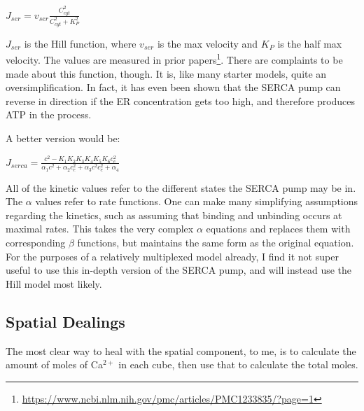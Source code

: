 \documentclass[12pt]{amsart}
\begin{document}
\begin{center}

    $J_{ser} = v_{ser}\frac{C^2_{cyt}}{C^2_{cyt} + K^2_P}$\\
    
\end{center}

\bigskip

 $J_{ser}$ is the Hill function, where $v_{ser}$ is the max velocity and $K_P$ is the half max velocity. The values are measured in prior papers\footnote{\url{https://www.ncbi.nlm.nih.gov/pmc/articles/PMC1233835/?page=1}}. There are complaints to be made about this function, though. It is, like many starter models, quite an oversimplification. In fact, it has even been shown that the SERCA pump can reverse in direction if the ER concentration gets too high, and therefore produces ATP in the process. \newline

 A better version would be: 

 \bigskip

 \begin{center}

    $J_{serca} = \frac{c^2 - K_1K_2K_3K_4K_5K_6c_e^2}{\alpha_1c^2 + \alpha_2c_e^2 + \alpha_3c^2c^2_e + \alpha_4}$
     
 \end{center}

 \bigskip

 All of the kinetic values refer to the different states the SERCA pump may be in. The $\alpha$ values refer to rate functions. One can make many simplifying assumptions regarding the kinetics, such as assuming that binding and unbinding occurs at maximal rates. This takes the very complex $\alpha$ equations and replaces them with corresponding $\beta$ functions, but maintains the same form as the original equation. For the purposes of a relatively multiplexed model already, I find it not super useful to use this in-depth version of the SERCA pump, and will instead use the Hill model most likely.

 
\subsection{Spatial Dealings} The most clear way to heal with the spatial component, to me, is to calculate the amount of moles of Ca$^{2+}$ in each cube, then use that to calculate the total moles.\newline
\end{document}
